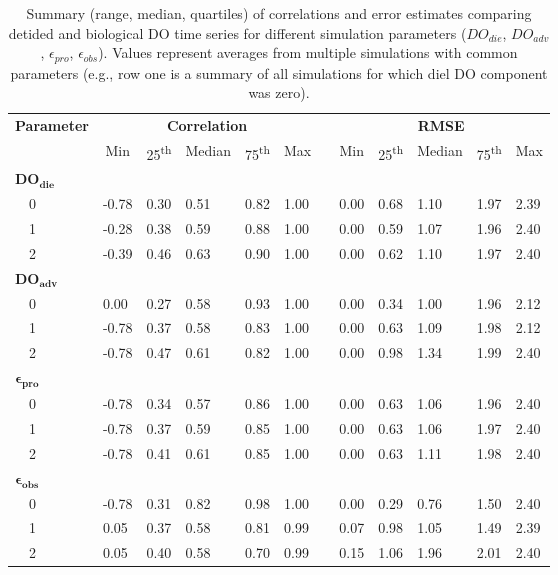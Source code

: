 \documentclass[letterpaper,12pt,oneside]{article}\usepackage[]{graphicx}\usepackage[]{color}
\begin{document}
%
\begin{table}[h]
\caption{Summary (range, median, quartiles) of correlations and error estimates comparing detided and biological \ac{DO} time series for different simulation parameters ($DO_{die}$, $DO_{adv}$, $\epsilon_{pro}$, $\epsilon_{obs}$).  Values represent averages from multiple simulations with common parameters (e.g., row one is a summary of all simulations for which diel \ac{DO} component was zero).\label{tab:dtd_perf1}} 
\begin{center}
\begin{tabular}{llllllclllll}
\hline\hline
\multicolumn{1}{l}{\bfseries Parameter}&\multicolumn{5}{c}{\bfseries Correlation}&\multicolumn{1}{c}{\bfseries }&\multicolumn{5}{c}{\bfseries RMSE}\tabularnewline
\cline{2-6} \cline{8-12}
\multicolumn{1}{l}{}&\multicolumn{1}{c}{Min}&\multicolumn{1}{c}{25\textsuperscript{th}}&\multicolumn{1}{c}{Median}&\multicolumn{1}{c}{75\textsuperscript{th}}&\multicolumn{1}{c}{Max}&\multicolumn{1}{c}{}&\multicolumn{1}{c}{Min}&\multicolumn{1}{c}{25\textsuperscript{th}}&\multicolumn{1}{c}{Median}&\multicolumn{1}{c}{75\textsuperscript{th}}&\multicolumn{1}{c}{Max}\tabularnewline
\hline
{\bfseries $\boldsymbol{DO_{die}}$}&&&&&&&&&&&\tabularnewline
~~0&-0.78&0.30&0.51&0.82&1.00&&0.00&0.68&1.10&1.97&2.39\tabularnewline
~~1&-0.28&0.38&0.59&0.88&1.00&&0.00&0.59&1.07&1.96&2.40\tabularnewline
~~2&-0.39&0.46&0.63&0.90&1.00&&0.00&0.62&1.10&1.97&2.40\tabularnewline
\hline
{\bfseries $\boldsymbol{DO_{adv}}$}&&&&&&&&&&&\tabularnewline
~~0& 0.00&0.27&0.58&0.93&1.00&&0.00&0.34&1.00&1.96&2.12\tabularnewline
~~1&-0.78&0.37&0.58&0.83&1.00&&0.00&0.63&1.09&1.98&2.12\tabularnewline
~~2&-0.78&0.47&0.61&0.82&1.00&&0.00&0.98&1.34&1.99&2.40\tabularnewline
\hline
{\bfseries $\boldsymbol{\epsilon_{pro}}$}&&&&&&&&&&&\tabularnewline
~~0&-0.78&0.34&0.57&0.86&1.00&&0.00&0.63&1.06&1.96&2.40\tabularnewline
~~1&-0.78&0.37&0.59&0.85&1.00&&0.00&0.63&1.06&1.97&2.40\tabularnewline
~~2&-0.78&0.41&0.61&0.85&1.00&&0.00&0.63&1.11&1.98&2.40\tabularnewline
\hline
{\bfseries $\boldsymbol{\epsilon_{obs}}$}&&&&&&&&&&&\tabularnewline
~~0&-0.78&0.31&0.82&0.98&1.00&&0.00&0.29&0.76&1.50&2.40\tabularnewline
~~1& 0.05&0.37&0.58&0.81&0.99&&0.07&0.98&1.05&1.49&2.39\tabularnewline
~~2& 0.05&0.40&0.58&0.70&0.99&&0.15&1.06&1.96&2.01&2.40\tabularnewline
\hline
\end{tabular}
\end{center}
\end{table}
\end{document}
